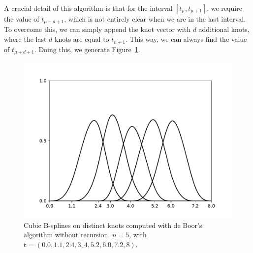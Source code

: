 \begin{solution}
    A crucial detail of this algorithm is that for the interval $[t_{\mu}, t_{\mu+1}]$, we require the value of $t_{\mu + d + 1}$, which is not entirely clear when we are in the last interval.
    To overcome this, we can simply append the knot vector with $d$ additional knots, where the last $d$ knots are equal to $t_{n+1}$.
    This way, we can always find the value of $t_{\mu + d + 1}$.
    Doing this, we generate Figure~\ref{fig:spline_deboor}.

    \begin{figure}
        \centering
        \includegraphics[width=0.6\linewidth]{3_bsplines/de_boor.pdf}
        \caption{Cubic B-splines on distinct knots computed with de Boor's algorithm without recursion. $n = 5$, with $\mathbf{t} = (0.0, 1.1, 2.4, 3, 4, 5.2, 6.0, 7.2, 8)$.\label{fig:spline_deboor}}
    \end{figure}
\end{solution}